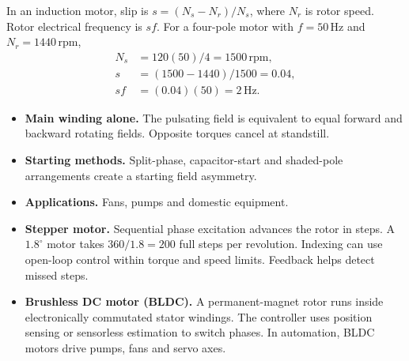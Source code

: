 \documentclass[12pt,a4paper]{article}
\begin{document}
In an induction motor, slip is \(s=(N_s-N_r)/N_s\), where \(N_r\) is rotor speed. Rotor electrical frequency is \(sf\). For a four-pole motor with \(f=50\,\mathrm{Hz}\) and \(N_r=1440\,\mathrm{rpm}\),
\[
\begin{aligned}
N_s &=120(50)/4=1500\,\mathrm{rpm},\\
s   &=(1500-1440)/1500=0.04,\\
sf  &=(0.04)(50)=2\,\mathrm{Hz}.
\end{aligned}
\]

\begin{tcolorbox}[tikzbox,title={From rotating field to induction-motor torque},unbreakable]
\centering
{}
\end{tcolorbox}

\begin{itemize}[leftmargin=*, itemsep=3pt, topsep=4pt]
  \item \textbf{Main winding alone.} The pulsating field is equivalent to equal forward and backward rotating fields. Opposite torques cancel at standstill.
  \item \textbf{Starting methods.} Split-phase, capacitor-start and shaded-pole arrangements create a starting field asymmetry.
  \item \textbf{Applications.} Fans, pumps and domestic equipment.
\end{itemize}

\begin{itemize}[leftmargin=*, itemsep=3pt, topsep=4pt]
  \item \textbf{Stepper motor.} Sequential phase excitation advances the rotor in steps. A \(1.8^\circ\) motor takes \(360/1.8=200\) full steps per revolution. Indexing can use open-loop control within torque and speed limits. Feedback helps detect missed steps.
  \item \textbf{Brushless DC motor (BLDC).} A permanent-magnet rotor runs inside electronically commutated stator windings. The controller uses position sensing or sensorless estimation to switch phases. In automation, BLDC motors drive pumps, fans and servo axes.
\end{itemize}
\end{document}
